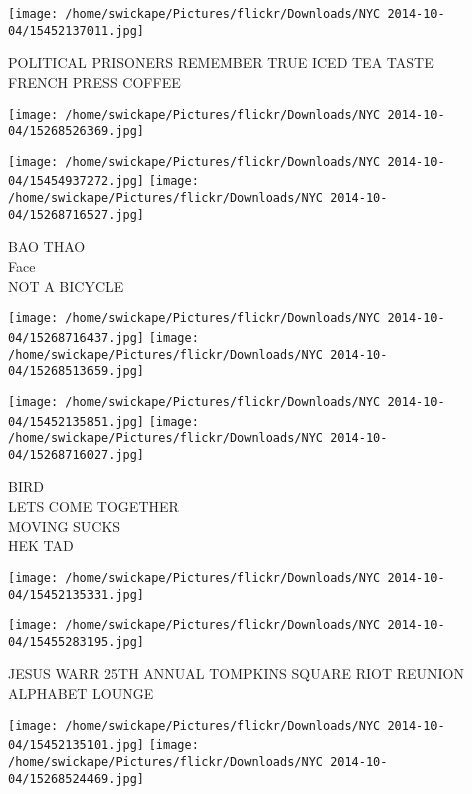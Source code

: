 \documentclass[10pt,letterpaper]{article}
\begin{document}
\vspace{0.25in}
\texttt{[image: /home/swickape/Pictures/flickr/Downloads/NYC 2014-10-04/15452137011.jpg]}

POLITICAL PRISONERS REMEMBER TRUE ICED TEA TASTE\\
FRENCH PRESS COFFEE\\
\pagebreak

\texttt{[image: /home/swickape/Pictures/flickr/Downloads/NYC 2014-10-04/15268526369.jpg]}

\vspace{0.25in}
\texttt{[image: /home/swickape/Pictures/flickr/Downloads/NYC 2014-10-04/15454937272.jpg]}
\texttt{[image: /home/swickape/Pictures/flickr/Downloads/NYC 2014-10-04/15268716527.jpg]}

BAO THAO\\
Face\\
NOT A BICYCLE\\
\pagebreak

\texttt{[image: /home/swickape/Pictures/flickr/Downloads/NYC 2014-10-04/15268716437.jpg]}
\texttt{[image: /home/swickape/Pictures/flickr/Downloads/NYC 2014-10-04/15268513659.jpg]}

\texttt{[image: /home/swickape/Pictures/flickr/Downloads/NYC 2014-10-04/15452135851.jpg]}
\texttt{[image: /home/swickape/Pictures/flickr/Downloads/NYC 2014-10-04/15268716027.jpg]}

BIRD\\
LETS COME TOGETHER\\
MOVING SUCKS\\
HEK TAD\\
\pagebreak

\texttt{[image: /home/swickape/Pictures/flickr/Downloads/NYC 2014-10-04/15452135331.jpg]}

\vspace{0.25in}
\texttt{[image: /home/swickape/Pictures/flickr/Downloads/NYC 2014-10-04/15455283195.jpg]}

JESUS WARR 25TH ANNUAL TOMPKINS SQUARE RIOT REUNION\\
ALPHABET LOUNGE\\
\pagebreak

\texttt{[image: /home/swickape/Pictures/flickr/Downloads/NYC 2014-10-04/15452135101.jpg]}
\texttt{[image: /home/swickape/Pictures/flickr/Downloads/NYC 2014-10-04/15268524469.jpg]}
\end{document}
